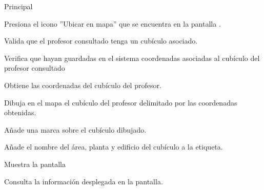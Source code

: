 \begin{UCtrayectoria}{Principal}

	\UCpaso[\UCactor] Presiona el icono ''Ubicar en mapa'' que se encuentra en la pantalla .

	\UCpaso Valida que el profesor consultado tenga un cubículo asociado. 

	\UCpaso Verifica que hayan guardadas en el sistema coordenadas asociadas al cubículo del profesor consultado

	\UCpaso Obtiene las coordenadas del cubículo del profesor.

	\UCpaso Dibuja en el mapa el cubículo del profesor delimitado por las coordenadas obtenidas. 

	\UCpaso Añade una marca sobre el cubículo dibujado.
	
	\UCpaso Añade el nombre del área, planta y edificio del cubículo a la etiqueta.
	
	\UCpaso Muestra la pantalla 

	\UCpaso[\UCactor] Consulta la información desplegada en la pantalla.
\end{UCtrayectoria}


